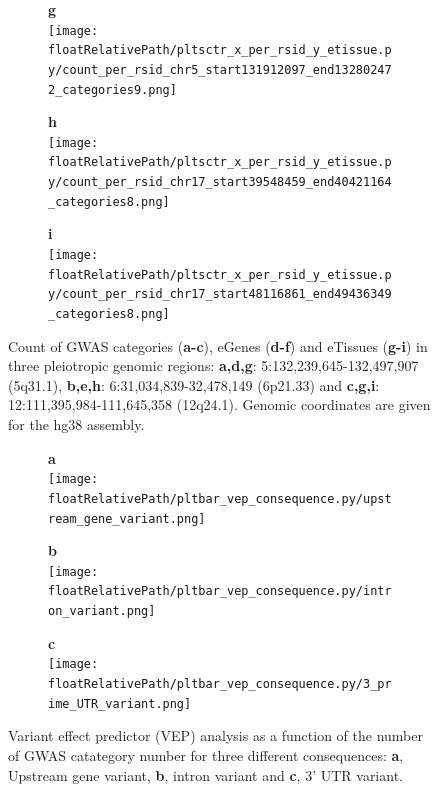 \begin{figure}[!tbp]
\begin{subfigure}[]{.32\textwidth}
\textbf{g}
\\
\texttt{[image: \\floatRelativePath/pltsctr\_x\_per\_rsid\_y\_etissue.py/count\_per\_rsid\_chr5\_start131912097\_end132802472\_categories9.png]}
\end{subfigure}
%
\begin{subfigure}[]{.32\textwidth}
\textbf{h}
\\
\texttt{[image: \\floatRelativePath/pltsctr\_x\_per\_rsid\_y\_etissue.py/count\_per\_rsid\_chr17\_start39548459\_end40421164\_categories8.png]}
\end{subfigure}
%
\begin{subfigure}[]{.32\textwidth}
\textbf{i}
\\
\texttt{[image: \\floatRelativePath/pltsctr\_x\_per\_rsid\_y\_etissue.py/count\_per\_rsid\_chr17\_start48116861\_end49436349\_categories8.png]}
\end{subfigure}

\caption{Count of GWAS categories (\textbf{a-c}), eGenes (\textbf{d-f}) and eTissues (\textbf{g-i}) in three pleiotropic genomic regions: \textbf{a,d,g}: 5:132,239,645-132,497,907 (5q31.1), \textbf{b,e,h}: 6:31,034,839-32,478,149 (6p21.33) and \textbf{c,g,i}: 12:111,395,984-111,645,358 (12q24.1). Genomic coordinates are given for the hg38 assembly.} \label{fig:region_gwas_egenes_tissues}
%
\end{figure}
%
%
\begin{figure}[!tbp]
\centering
%
\begin{subfigure}[]{.32\textwidth}
\textbf{a}
\\
\texttt{[image: \\floatRelativePath/pltbar\_vep\_consequence.py/upstream\_gene\_variant.png]}
%
\end{subfigure}
%
\begin{subfigure}[]{.32\textwidth}
\textbf{b}
\\
\texttt{[image: \\floatRelativePath/pltbar\_vep\_consequence.py/intron\_variant.png]}
%
\end{subfigure}
%
\begin{subfigure}[]{.32\textwidth}
\textbf{c}
\\
\texttt{[image: \\floatRelativePath/pltbar\_vep\_consequence.py/3\_prime\_UTR\_variant.png]}
%
\end{subfigure}
%
\caption{Variant effect predictor (VEP) analysis as a function of the number of GWAS catategory number for three different consequences: \textbf{a}, Upstream gene variant, \textbf{b}, intron variant and \textbf{c}, 3' UTR variant.} \label{fig:vep_consequence}
%
\end{figure}
